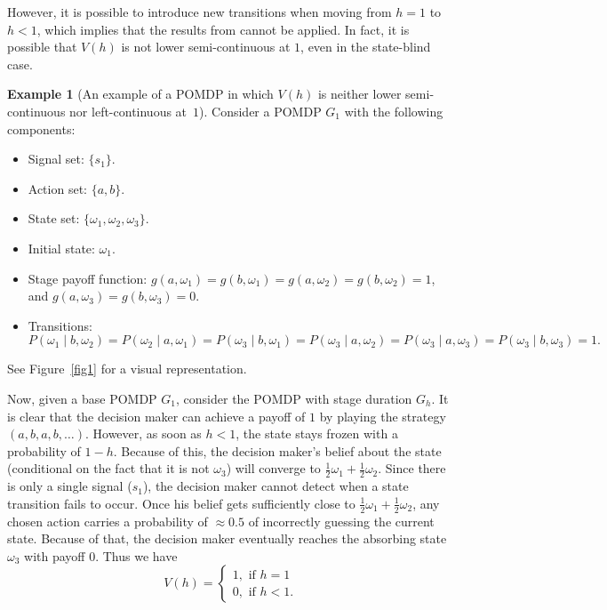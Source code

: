 \documentclass[english,openary,11pt]{article}
\theoremstyle{definition}
\newtheorem{example}{Example}
\begin{document}
However, it is possible to introduce new transitions when moving from $h=1$ to $h<1$, which implies that the results from \cite{Cha22} cannot be applied. In fact, it is possible that $V(h)$ is not lower semi-continuous at $1$, even in the state-blind case. 

\begin{example}[An example of a POMDP in which $V(h)$ is neither lower semi-continuous nor left-continuous at~$1$]
\label{exam1}
Consider a POMDP $G_1$ with the following components:
\begin{itemize}
	\item Signal set: $\{s_1\}$.
	\item Action set: $\{a, b\}$.
	\item State set: $\{\omega_1, \omega_2, \omega_3\}$.
	\item Initial state: $\omega_1$.
	\item Stage payoff function: $g(a,\omega_1) = g(b,\omega_1) = g(a,\omega_2) = g(b,\omega_2) = 1$, and $g(a,\omega_3) = g(b,\omega_3) = 0$.
	\item Transitions: $$P(\omega_1 \mid b,\omega_2) = P(\omega_2 \mid a,\omega_1) = P(\omega_3 \mid b, \omega_1) = P(\omega_3 \mid a,\omega_2) = P(\omega_3 \mid a,\omega_3) = P(\omega_3 \mid b,\omega_3) = 1.$$
\end{itemize}
See Figure~\ref{fig1} for a visual representation. 

Now, given a base POMDP  $G_1$, consider the POMDP with stage duration $G_h$. It is clear that the decision maker can achieve a payoff of $1$ by playing the strategy $(a,b,a,b, \ldots)$. However, as soon as $h<1$, the state stays frozen with a probability of $1-h$. Because of this, the decision maker's belief about the state (conditional on the fact that it is not $\omega_3$) will converge to $\frac 1 2 \omega_1 + \frac 1 2 \omega_2$. 
Since there is only a single signal ($s_1$), the decision maker cannot detect when a state transition fails to occur. Once his belief gets sufficiently close to
$\frac{1}{2}\omega_1 + \frac{1}{2}\omega_2$, any chosen action carries a probability of $\approx 0.5$ of incorrectly guessing the current state. Because of that, the decision maker eventually reaches the absorbing state $\omega_3$ with payoff $0$. Thus we have
$$V(h) = 
\begin{cases}
1, \text{ if } h = 1 \\
0, \text{ if } h < 1.
\end{cases}$$
\end{example}
\end{document}

